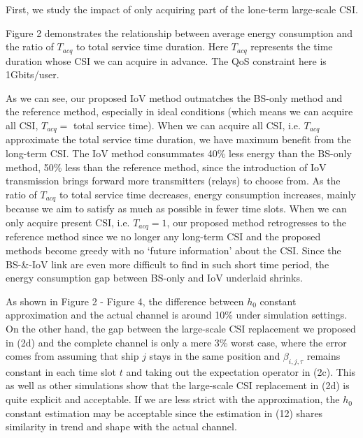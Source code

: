 \documentclass{ieeeaccess}
\begin{document}

First, we study the impact of only acquiring part of the lone-term large-scale CSI. 

Figure 2 demonstrates the relationship between average energy consumption and the ratio of ${T_{acq}}$ to total service time duration. Here ${T_{acq}}$ represents the time duration whose CSI we can acquire in advance. The QoS constraint here is 1Gbits/user. 

As we can see, our proposed IoV method outmatches the BS-only method and the reference method, especially in ideal conditions (which means we can acquire all CSI, ${T_{acq}}=$ total service time). %
When we can acquire all CSI, i.e. ${T_{acq}}$ approximate the total service time duration, we have maximum benefit from the long-term CSI. The IoV method consummates 40\% less energy than the BS-only method, 50\% less than the reference method, since the introduction of IoV transmission brings forward more transmitters (relays) to choose from. As the ratio of ${T_{acq}}$ to total service time decreases, %
energy consumption increases, mainly because we aim to satisfy as much as possible in fewer time slots. When we can only acquire present CSI, i.e. ${T_{acq}} = 1$, our proposed method retrogresses to the reference method since we no longer any long-term CSI and the proposed methods become greedy with no `future information' about the CSI. Since the BS-\&-IoV link are even more difficult to find in such short time period, the energy consumption gap between BS-only and IoV underlaid shrinks.  

As shown in Figure 2 - Figure 4, the difference between ${h_0}$ constant approximation and the actual channel is around 10\% under simulation settings. On the other hand, the gap between the large-scale CSI replacement we proposed in (2d) and the complete channel is only a mere 3\% worst case, where the error comes from assuming that ship $j$ stays in the same position and $\beta _{i,j,\tau }$ remains constant in each time slot $t$ and taking out the expectation operator in (2c). This as well as other simulations show that the large-scale CSI replacement in (2d) is quite explicit and acceptable. If we are less strict with the approximation, the ${h_0}$ constant estimation may be acceptable since the estimation in (12) shares similarity in trend and shape with the actual channel. 
\end{document}
